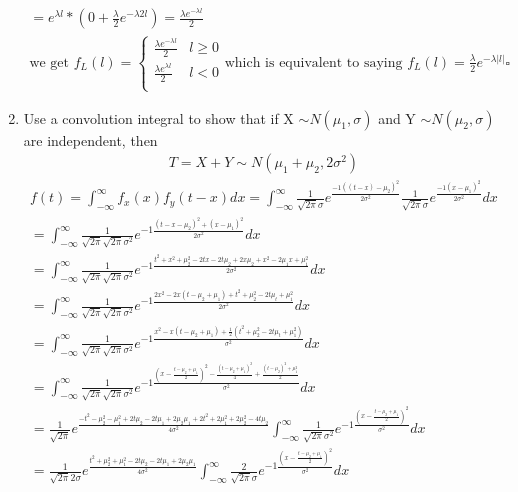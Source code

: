 \documentclass[11pt]{article}
\begin{document}
\begin{enumerate}
\begin{gather}
	= e^{\lambda l} * (0+\frac{\lambda}{2}e^{-\lambda 2l}) = \frac{\lambda e^{-\lambda l}}{2} \\
	\text{we get  }
	f_L(l)=
	\begin{cases}
		\frac{\lambda e^{-\lambda l}}{2} & l \ge 0 \\
		\frac{\lambda e^{\lambda l}}{2} & l < 0\\
	\end{cases}
	\text{which is equivalent to saying } 	
	f_L(l) = \frac{\lambda}{2}e^{-\lambda|l|} \square
\end{gather}
\item Use a convolution integral to show that if X $\sim N(\mu_1,\sigma)$ and Y $\sim N(\mu_2,\sigma)$ are independent, then
\begin{gather}
	T=X+Y\sim N(\mu_1+\mu_2,2\sigma^2)
\end{gather}
\begin{gather}
	f(t)=\int_{-\infty}^{\infty}f_x(x)f_y(t-x)dx = \int_{-\infty}^{\infty} \frac{1}{\sqrt{2\pi}\sigma}e^{\frac{-1((t-x)-\mu_2)^2}{2\sigma^2}} \frac{1}{\sqrt{2\pi}\sigma}e^{\frac{-1(x-\mu_1)^2}{2\sigma^2}}dx\\
	=\int_{-\infty}^{\infty} \frac{1}{\sqrt{2\pi}\sqrt{2\pi}\sigma^2}e^{-1\frac{(t-x-\mu_2)^2+(x-\mu_1)^2}{2\sigma^2}}dx\\
	=\int_{-\infty}^{\infty} \frac{1}{\sqrt{2\pi}\sqrt{2\pi}\sigma^2}e^{-1\frac{t^2+x^2+\mu_2^2-2tx-2t\mu_2+2x\mu_2+x^2-2\mu_1x+\mu_1^2}{2\sigma^2}}dx\\
	=\int_{-\infty}^{\infty} \frac{1}{\sqrt{2\pi}\sqrt{2\pi}\sigma^2}e^{-1\frac{2x^2 -2x(t-\mu_2+\mu_1) + t^2 + \mu_2^2 -2t\mu_t +\mu_1^2}{2\sigma^2}}dx\\
	=\int_{-\infty}^{\infty} \frac{1}{\sqrt{2\pi}\sqrt{2\pi}\sigma^2}e^{-1\frac{x^2 -x(t-\mu_2+\mu_1) + \frac{1}{2}(t^2 + \mu_2^2 -2t\mu_t +\mu_1^2)}{\sigma^2}}dx\\
	=\int_{-\infty}^{\infty} \frac{1}{\sqrt{2\pi}\sqrt{2\pi}\sigma^2}e^{-1\frac{(x-\frac{t-\mu_2+\mu_1}{2})^2 - \frac{(t-\mu_2+\mu_1)^2}{4} + \frac{(t-\mu_2)^2 +\mu_1^2}{2}}{\sigma^2}}dx\\
	=\frac{1}{\sqrt{2\pi}}e^{\frac{-t^2 -\mu_2^2-\mu_1^2+2t\mu_2-2t\mu_1+2\mu_2\mu_1 +2t^2+2\mu_1^2+2\mu_2^2-4t\mu_2}{4\sigma^2}}\int_{-\infty}^{\infty} \frac{1}{\sqrt{2\pi}\sigma^2}e^{-1\frac{(x-\frac{t-\mu_2+\mu_1}{2})^2 }{\sigma^2}}dx\\
	=\frac{1}{\sqrt{2\pi}2\sigma}e^{\frac{t^2 +\mu_2^2+\mu_1^2-2t\mu_2-2t\mu_1+2\mu_2\mu_1 }{4\sigma^2}}\int_{-\infty}^{\infty} \frac{2}{\sqrt{2\pi}\sigma}e^{-1\frac{(x-\frac{t-\mu_2+\mu_1}{2})^2 }{\sigma^2}}dx\\

\end{gather}
\end{enumerate}
\end{document}
